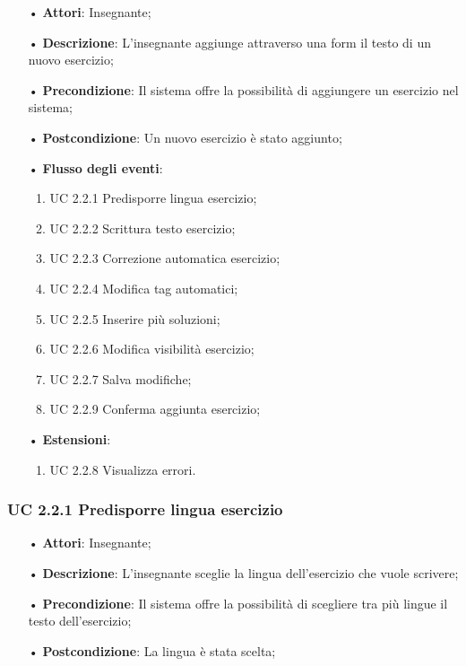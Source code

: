 \begin{itemize}
	\item[•] \textbf{Attori}: Insegnante;
	\item[•] \textbf{Descrizione}: L'insegnante aggiunge attraverso una form il testo di un nuovo esercizio;
	\item[•] \textbf{Precondizione}: Il sistema offre la possibilità di aggiungere un esercizio nel sistema;
	\item[•] \textbf{Postcondizione}: Un nuovo esercizio è stato aggiunto;
	\item[•] \textbf{Flusso degli eventi}:
	\begin{enumerate}
		\item UC 2.2.1 Predisporre lingua esercizio;
		\item UC 2.2.2 Scrittura testo esercizio;
		\item UC 2.2.3 Correzione automatica esercizio;
		\item UC 2.2.4 Modifica {tag} automatici;
		\item UC 2.2.5 Inserire più soluzioni;
		\item UC 2.2.6 Modifica visibilità esercizio;
		\item UC 2.2.7 Salva modifiche;
		\item UC 2.2.9 Conferma aggiunta esercizio;
	\end{enumerate}
	\item[•] \textbf{Estensioni}:	
	\begin{enumerate}
		\item UC 2.2.8 Visualizza errori.
	\end{enumerate}
\end{itemize}

\subsubsection{UC 2.2.1 Predisporre lingua esercizio}
\begin{itemize}
	\item[•] \textbf{Attori}: Insegnante;
	\item[•] \textbf{Descrizione}: L'insegnante sceglie la lingua dell’esercizio che vuole scrivere;
	\item[•] \textbf{Precondizione}: Il sistema offre la possibilità di scegliere tra più lingue il testo dell’esercizio;
	\item[•] \textbf{Postcondizione}: La lingua è stata scelta;
\end{itemize}

